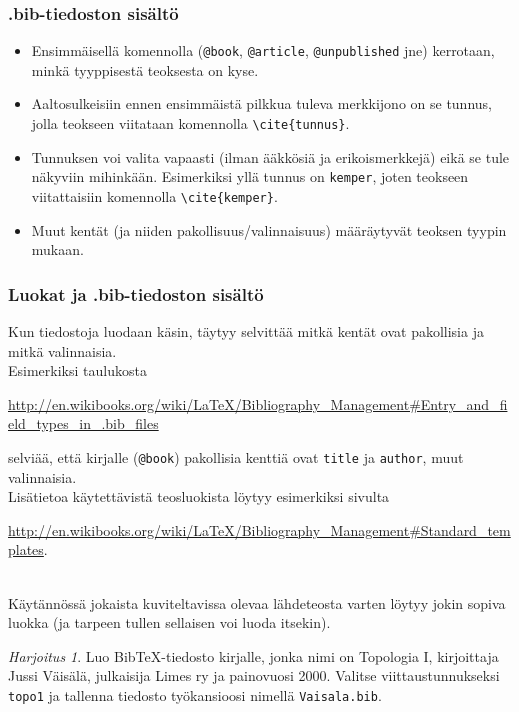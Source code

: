 \documentclass[handout,hyperref={colorlinks=true}]{beamer}
\theoremstyle{remark}
\newtheorem{harj}{Harjoitus}[section]
\newcommand{\vaihto}{\\ \vspace{10pt}}
\newcommand{\BibTeX}{BibTeX}
\begin{document}
\begin{frame}[fragile]
    \frametitle{.bib-tiedoston sisältö}
    \begin{itemize}
        \item Ensimmäisellä komennolla (\verb-@book-, \verb-@article-, \verb-@unpublished- jne) kerrotaan, minkä tyyppisestä teoksesta on kyse. 
        \item Aaltosulkeisiin ennen ensimmäistä pilkkua tuleva merkkijono on se tunnus, jolla teokseen viitataan komennolla \verb-\cite{tunnus}-. 
        \item Tunnuksen voi valita vapaasti (ilman ääkkösiä ja erikoismerkkejä) eikä se tule näkyviin mihinkään.  Esimerkiksi yllä tunnus on \verb-kemper-, joten teokseen viitattaisiin komennolla \verb-\cite{kemper}-.
        \item Muut kentät (ja niiden pakollisuus/valinnaisuus) määräytyvät teoksen tyypin mukaan.
    \end{itemize}
\end{frame}
\begin{frame}[fragile]
    \frametitle{Luokat ja .bib-tiedoston sisältö}
    Kun tiedostoja luodaan käsin, täytyy selvittää mitkä kentät ovat pakollisia ja mitkä valinnaisia. 
    \vaihto
    Esimerkiksi taulukosta 
    \begin{scriptsize}
        \url{http://en.wikibooks.org/wiki/LaTeX/Bibliography_Management#Entry_and_field_types_in_.bib_files}
    \end{scriptsize}
    selviää, että kirjalle (\verb-@book-) pakollisia kenttiä ovat \verb-title- ja \verb-author-, muut valinnaisia.
    \vaihto
    Lisätietoa käytettävistä teosluokista löytyy esimerkiksi sivulta
    \begin{scriptsize}
        \url{http://en.wikibooks.org/wiki/LaTeX/Bibliography_Management#Standard_templates}.
    \end{scriptsize}
    \vaihto
    Käytännössä jokaista kuviteltavissa olevaa lähdeteosta varten löytyy jokin sopiva luokka (ja tarpeen tullen sellaisen voi luoda itsekin).
\end{frame}
\begin{frame}[fragile]
    \begin{harj}
        Luo \BibTeX-tiedosto kirjalle, jonka nimi on Topologia I, kirjoittaja Jussi Väisälä, julkaisija Limes ry ja painovuosi 2000. Valitse viittaustunnukseksi \verb-topo1- ja tallenna tiedosto työkansioosi nimellä \verb-Vaisala.bib-.
    \end{harj}
\end{frame}
\end{document}
